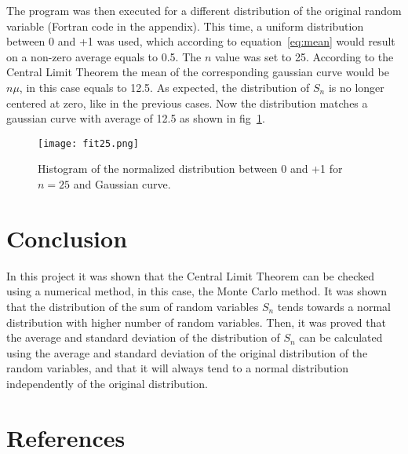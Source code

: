 \documentclass[12pt]{article}
\begin{document}
The program was then executed for a different distribution of the original random variable (Fortran code in the appendix). This time, a uniform distribution between 0 and +1 was used, which according to equation~\ref{eq:mean} would result on a non-zero average equals to 0.5. The $n$ value was set to 25. According to the Central Limit Theorem the mean of the corresponding gaussian curve would be $n \mu$, in this case equals to 12.5. As expected, the distribution of $S_{n}$ is no longer centered at zero, like in the previous cases. Now the distribution matches a gaussian curve with average of 12.5 as shown in fig~\ref{ref:fit25}.

\begin{figure}[H]
	\centering
	\texttt{[image: fit25.png]}
	\caption{Histogram of the normalized distribution between 0 and +1 for $n = 25$ and Gaussian curve.}
	\label{ref:fit25}
\end{figure}


\section*{Conclusion}
In this project it was shown that the Central Limit Theorem can be checked using a numerical method, in this case, the Monte Carlo method. It was shown that the distribution of the sum of random variables $S_{n}$ tends towards a normal distribution with higher number of random variables. Then, it was proved that the average and standard deviation of the distribution of $S_{n}$ can be calculated using the average and standard deviation of the original distribution of the random variables, and that it will always tend to a normal distribution independently of the original distribution.


\section*{References}
\printbibliography[heading=none]
\end{document}
